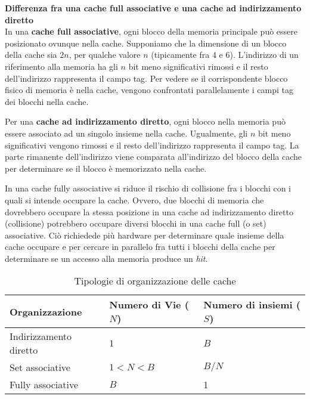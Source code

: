 \begin{exmp}
    \textbf{Differenza fra una cache full associative e una cache ad
    indirizzamento diretto} \\

    In una \textbf{cache full associative}, ogni blocco della memoria principale
    può essere posizionato ovunque nella cache. Supponiamo che la dimensione di
    un blocco della cache sia $2n$, per qualche valore $n$ (tipicamente fra 4 e
    6). L'indirizzo di un riferimento alla memoria ha gli $n$ bit meno
    significativi rimossi e il resto dell'indirizzo rappresenta il campo tag.
    Per vedere se il corrispondente blocco fisico di memoria è nella cache,
    vengono confrontati parallelamente i campi tag dei blocchi nella cache.

    Per una \textbf{cache ad indirizzamento diretto}, ogni blocco nella memoria
    può essere associato ad un singolo insieme nella cache. Ugualmente, gli $n$
    bit meno significativi vengono rimossi e il resto dell'indirizzo rappresenta
    il campo tag. La parte rimanente dell'indirizzo viene comparata
    all'indirizzo del blocco della cache per determinare se il blocco è
    memorizzato nella cache.

    In una cache fully associative si riduce il rischio di collisione fra i
    blocchi con i quali si intende occupare la cache. Ovvero, due blocchi di
    memoria che dovrebbero occupare la stessa posizione in una cache ad
    indirizzamento diretto (collisione) potrebbero occupare diversi blocchi in
    una cache full (o set) associative. Ciò richiedede più hardware per
    determinare quale insieme della cache occupare e per cercare in parallelo
    fra tutti i blocchi della cache per determinare se un accesso alla memoria
    produce un \textit{hit}.

    \begin{table}[htbp]
        \centering
        \caption{Tipologie di organizzazione delle cache}
        \label{tab:caches}
        \begin{tabular}{|l|l|l|}
        \hline
        Organizzazione         & Numero di Vie ($N$) & Numero di insiemi ($S$)
        \\ \hline
        Indirizzamento diretto & $1$                 & $B$ \\ \hline
        Set associative        & $1 < N < B$         & $B/N$ \\ \hline
        Fully associative      & $B$                 & 1 \\ \hline
        \end{tabular}
    \end{table}
\end{exmp}


